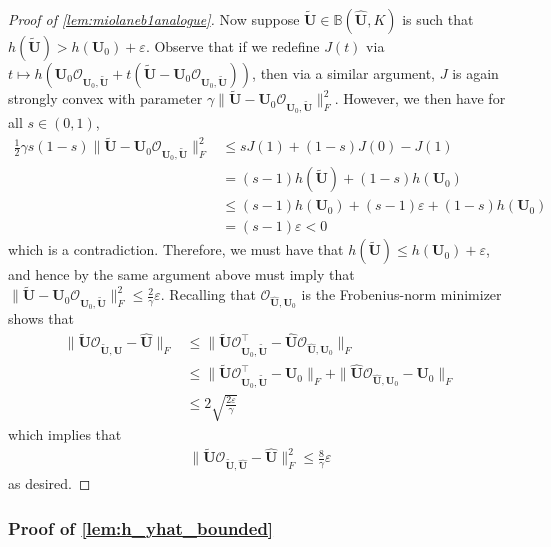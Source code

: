 \documentclass[10pt]{article}
\newcommand{\eps}{\ensuremath{\varepsilon}}
\renewcommand{\t}{^{\top}}
\renewcommand{\hat}{\widehat}
\renewcommand{\tilde}{\widetilde}
\theoremstyle{definition}
\begin{document}
\begin{proof}[Proof of \cref{lem:miolaneb1analogue}]
Now suppose $\bm{\tilde U} \in \mathbb{B}(\bm{\hat U},K)$ is such that $h(\bm{\tilde U}) > h(\bm{U}_0) + \eps$.  
Observe that if we redefine $J(t)$ via $t\mapsto h(\bm{U}_0 \mathcal{O}_{\bm{U}_0,\bm{\tilde U}} + t (\bm{\tilde U} - \bm{U}_0\mathcal{O}_{\bm{U}_0,\bm{\tilde U}} ) )$, then via a similar argument, $J$ is again strongly convex with parameter $\gamma \| \bm{\tilde U} - \bm{U}_0 \mathcal{O}_{\bm{U}_0,\bm{\tilde U}}\|_F^2$.  However, we then have for all $s \in (0,1)$,
\begin{align}
    \frac{1}{2} \gamma  s (1 - s) \| \bm{\tilde U} - \bm{U}_0 \mathcal{O}_{\bm{U}_0,\bm{\tilde U}} \|_F^2 &\leq s J(1) + (1 - s) J(0) - J(1) \\
    &= (s- 1) h(\bm{\tilde U}) + (1 - s) h(\bm{U}_0) \\
    &\leq (s-1) h(\bm{U}_0) + (s-1)\eps + (1-s) h(\bm{U}_0) \\
    &= (s-1)\eps < 0
\end{align}
which is a contradiction.  Therefore, we must have that $h(\bm{\tilde U}) \leq h(\bm{U}_0) + \eps$, and hence by the same argument above must imply that $\|\bm{\tilde U}  - \bm{U}_0 \mathcal{O}_{\bm{U}_0,\bm{\tilde U}} \|_F^2 \leq \frac{2}{\gamma}\eps$. Recalling that $\mathcal{O}_{\bm{\hat U},\bm{U}_0}$ is the Frobenius-norm minimizer shows that 
\begin{align}
    \| \bm{\tilde U}\mathcal{O}_{\bm{\tilde U},\bm{\hat U}} - \bm{\hat U}  \|_F &\leq \| \bm{\tilde U}\mathcal{O}_{\bm{U}_0 ,\bm{\tilde U}}\t - \bm{\hat U} \mathcal{O}_{\bm{\hat U},\bm{U}_0} \|_F \\
    &\leq \| \bm{\tilde U} \mathcal{O}_{\bm{U}_0,\bm{\tilde U}}\t - \bm{U}_0 \|_F + \| \bm{\hat U} \mathcal{O}_{\bm{\hat U},\bm{U}_0} - \bm{U}_0 \|_F \\
    &\leq 2 \sqrt{\frac{2\eps}{\gamma}}
\end{align}
which implies that 
\begin{align}
    \|\bm{\tilde U} \mathcal{O}_{\bm{\tilde U},\bm{\hat U}} - \bm{\hat U} \|_F^2 \leq \frac{8}{\gamma} \eps
\end{align}
as desired. 
\end{proof}





\subsubsection{Proof of \cref{lem:h_yhat_bounded}} \label{sec:h_yhat_bounded_proof}
\end{document}
